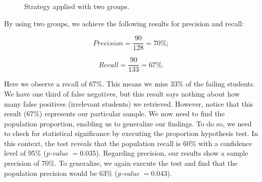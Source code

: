 \begin{figure}[!ht]
\begin{center}
{             \label{fig:2-2013-01}
         }
     \end{center}
     \caption{Strategy applied with two groups.}
	 \label{fig:2-groups}
\end{figure}

By using two groups, we achieve the following results for precision and recall:

\vspace{0.2cm}
\noindent
\begin{minipage}{.5\linewidth}
\centering
$$
Precision = \frac{90}{128} = 70\%;
$$
\end{minipage}
\begin{minipage}{.5\linewidth}
$$
Recall = \frac{90}{133} = 67\%.
$$
\end{minipage}
\vspace{0.2cm}

Here we observe a recall of 67\%. This means we miss 33\% of the failing students. We have one third of false negatives, but this result says nothing about how many false positives (irrelevant students) we retrieved. However, notice that this result (67\%) represents our particular sample. We now need to find the population proportion, enabling us to generalize our findings. To do so, we need to check for statistical significance by executing the proportion hypothesis test. In this context, the test reveals that the population recall is 60\% with a confidence level of 95\% (\textit{p-value} $= 0.035$). Regarding precision, our results show a sample precision of 70\%. To generalize, we again execute the test and find that the population precision would be 63\% (\textit{p-value} $= 0.043$).

